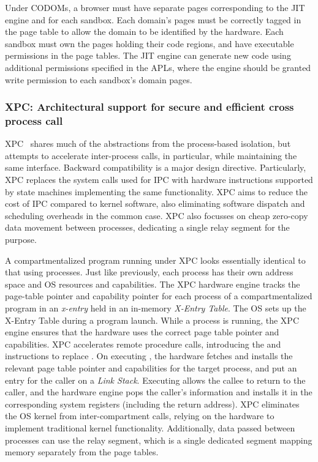 Under CODOMs, a browser must have separate pages corresponding to the
JIT engine and for each sandbox. 
Each domain's pages must be correctly tagged in the page table to allow
the domain to be identified by the hardware.
Each sandbox must own the pages holding their code regions, and have
executable permissions in the page tables. 
The JIT engine can generate new code using additional permissions specified
in the APLs, where the engine should be granted write permission to
each sandbox's domain pages.

\subsubsection{XPC: Architectural support for secure and efficient cross process call}

XPC~\cite{DuHXZC19XPC} shares much of the abstractions from the process-based
isolation, but attempts to accelerate inter-process calls, in particular, 
while maintaining the same interface.
Backward compatibility is a major design directive.
Particularly, XPC replaces the system calls used for IPC with hardware 
instructions supported by state machines implementing the same functionality.
XPC aims to reduce the cost of IPC compared to kernel software, 
also eliminating software dispatch and scheduling overheads in the common case.
XPC also focusses on cheap zero-copy data movement between processes,
dedicating a single relay segment for the purpose.

A compartmentalized program running under XPC looks essentially identical
to that using processes.
Just like previously, each process has their own address space and OS 
resources and capabilities.
The XPC hardware engine tracks the page-table pointer and capability pointer
for each process of a compartmentalized program in an \emph{x-entry} held in
an in-memory \emph{X-Entry Table}.
The OS sets up the X-Entry Table during a program launch.
While a process is running, the XPC engine ensures that the hardware uses the
correct page table pointer and capabilities.
XPC accelerates remote procedure calls, introducing the  and
 instructions to replace .
On executing , the hardware fetches and installs the relevant 
page table pointer and capabilities for the target process, 
and put an entry for the caller on a \emph{Link Stack}.
Executing  allows the callee to return to the caller, and the
hardware engine pops the caller's information and installs it in the
corresponding system registers (including the return address). 
XPC eliminates the OS kernel from inter-compartment calls, relying on the 
hardware to implement traditional kernel functionality.
Additionally, data passed between processes can use the relay segment, which
is a single dedicated segment mapping memory separately from the page tables.

